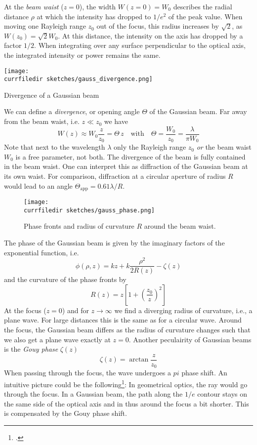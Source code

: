 At the \emph{beam waist} ($z=0$), the width $W(z=0) = W_0$ describes the radial distance $\rho$ at which the intensity  has dropped to $1/e^2$ of the peak value. When moving one Rayleigh range $z_0$ out of the focus, this radius increases by $\sqrt{2}$, as $W(z_0) = \sqrt{2} W_0$. At this distance, the intensity on the axis has dropped by a factor $1/2$. When integrating over any surface perpendicular to the optical axis, the integrated intensity or power remains the same.

\begin{marginfigure}
    \texttt{[image: \\currfiledir sketches/gauss\_divergence.png]}
   \caption{Divergence of a Gaussian beam}
\end{marginfigure}


We can define a \emph{divergence}, or opening angle $\Theta$ of the Gaussian beam. Far away from the beam waist, i.e. $z \ll z_0$ we have
\begin{equation}
    W(z) \approx W_0 \frac{z}{z_0} = \Theta \, z \quad \text{with} \quad \Theta = \frac{W_0}{z_0} = \frac{\lambda}{\pi W_0}
 \end{equation}
 Note that next to the wavelength $\lambda$ only the Rayleigh range $z_0$ \emph{or} the beam waist $W_0$ is a free parameter, not both. The divergence of the beam is fully contained in the beam waist. One can interpret this as diffraction of the Gaussian beam at its own waist. For comparison, diffraction at a circular aperture of radius $R$ would  lead to an angle $\Theta_\text{app} = 0.61 \lambda  / R$.

 \begin{figure}
    \texttt{[image: \\currfiledir sketches/gauss\_phase.png]}
   \caption{Phase fronts and radius of curvature $R$ around the beam waist.}
\end{figure}

The phase of the Gaussian beam is given by the imaginary factors of the exponential function, i.e.
\begin{equation}
    \phi(\rho, z) = k z + k  \frac{\rho^2}{2 R(z)}  -  \zeta(z) 
\end{equation}
and the curvature of the phase fronts by 
\begin{equation}
    R(z) = z \left[ 1 + \left( \frac{z_0}{z} \right)^2 \right] 
\end{equation}
At the focus ($z=0$) and for $z \rightarrow \infty$ we find a diverging radius of curvature, i.e., a plane wave. For large distances this is the same as for a circular wave. Around the focus, the Gaussian beam differs as the radius of curvature changes such that we also get a plane wave exactly at $z=0$. Another peculairity of Gaussian beams is the \emph{Gouy phase} $\zeta(z)$
\begin{equation}
    \zeta(z) =  \arctan \frac{z}{z_0} 
\end{equation}
When passing through the focus, the wave undergoes a $pi$ phase shift. An intuitive picture could be the following\footcite{Boyd1980IntuitiveEO}: In geometrical optics, the ray would go through the focus. In a Gaussian beam, the path along the $1/e$ contour stays on the same side of the optical axis and in thus around the focus a bit shorter. This is compensated by the Gouy phase shift.


